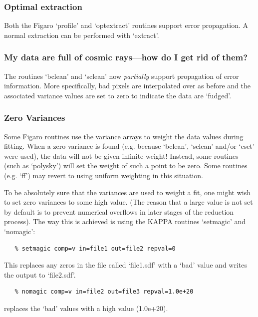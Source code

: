 \subsubsection{Optimal extraction}

Both the Figaro `profile' and `optextract' routines support error propagation.
A normal extraction can be performed with `extract'.

\subsubsection{My data are full of cosmic rays---how do I get rid of them?}

The routines `bclean' and `sclean' 
now {\it partially} support propagation of error
information. More specifically, bad pixels are interpolated over as before
and the associated variance values are set to zero to indicate the data are
`fudged'.

\subsubsection{Zero Variances}

Some Figaro routines use the variance arrays to weight the data values
during fitting. When a zero variance is found (e.g. because `bclean',
`sclean' 
and/or `cset' were used),
the data will not be given
infinite weight! Instead, some routines (such as `polysky') will set the
weight of such a point to be zero.  Some routines (e.g. `ff')
may revert to using uniform weighting in this situation.

To be absolutely sure that the variances are used to weight a fit, one
might wish to set zero variances to some high value.  (The reason
that a large value is not set by default is to prevent numerical overflows
in later stages of the reduction process). The way this is achieved is
using the KAPPA routines `setmagic' and `nomagic':

\begin{verbatim}
   % setmagic comp=v in=file1 out=file2 repval=0
\end{verbatim}

This replaces any zeros in the file called `file1.sdf' with a `bad' value
and writes the output to `file2.sdf'.

\begin{verbatim}
   % nomagic comp=v in=file2 out=file3 repval=1.0e+20
\end{verbatim}

replaces the `bad' values with a high value (1.0e+20).

